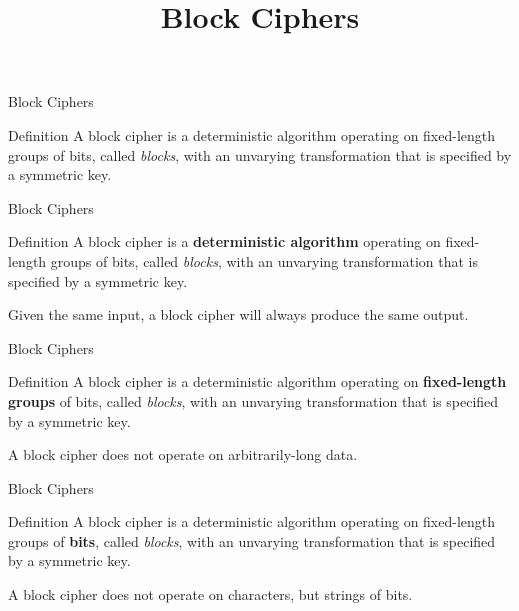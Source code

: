 \documentclass{beamer}
\title{Block Ciphers}
\begin{document}
\begin{frame}
	\titlepage
\end{frame}

\begin{frame}{Block Ciphers}
	\begin{block}{Definition}
		A block cipher is a deterministic algorithm operating on fixed-length
		groups of bits, called \textit{blocks}, with an unvarying transformation
		that is specified by a symmetric key.
	\end{block}
\end{frame}

\begin{frame}{Block Ciphers}
	\begin{block}{Definition}
		A block cipher is a \textbf{deterministic algorithm} operating on fixed-length
		groups of bits, called \textit{blocks}, with an unvarying transformation
		that is specified by a symmetric key.
	\end{block}

	\begin{block}
		Given the same input, a block cipher will always produce the same
		output.
	\end{block}
\end{frame}

\begin{frame}{Block Ciphers}
	\begin{block}{Definition}
		A block cipher is a deterministic algorithm operating on \textbf{fixed-length
		groups} of bits, called \textit{blocks}, with an unvarying transformation
		that is specified by a symmetric key.
	\end{block}

	\begin{block}{}
		A block cipher does not operate on arbitrarily-long data.
	\end{block}
\end{frame}

\begin{frame}{Block Ciphers}
	\begin{block}{Definition}
		A block cipher is a deterministic algorithm operating on fixed-length
		groups of \textbf{bits}, called \textit{blocks}, with an unvarying transformation
		that is specified by a symmetric key.
	\end{block}

	\begin{block}{}
		A block cipher does not operate on characters, but strings of bits.
	\end{block}
\end{frame}
\end{document}
